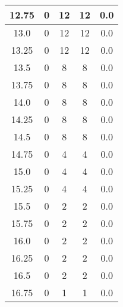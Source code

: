 \documentclass[letterpaper, 12pt]{article}
\begin{document}
\begin{longtable}{|c|c|c|c|c|}
\hline
12.75 & 0 & 12 & 12 & 0.0 \\
\hline
13.0 & 0 & 12 & 12 & 0.0 \\
\hline
13.25 & 0 & 12 & 12 & 0.0 \\
\hline
13.5 & 0 & 8 & 8 & 0.0 \\
\hline
13.75 & 0 & 8 & 8 & 0.0 \\
\hline
14.0 & 0 & 8 & 8 & 0.0 \\
\hline
14.25 & 0 & 8 & 8 & 0.0 \\
\hline
14.5 & 0 & 8 & 8 & 0.0 \\
\hline
14.75 & 0 & 4 & 4 & 0.0 \\
\hline
15.0 & 0 & 4 & 4 & 0.0 \\
\hline
15.25 & 0 & 4 & 4 & 0.0 \\
\hline
15.5 & 0 & 2 & 2 & 0.0 \\
\hline
15.75 & 0 & 2 & 2 & 0.0 \\
\hline
16.0 & 0 & 2 & 2 & 0.0 \\
\hline
16.25 & 0 & 2 & 2 & 0.0 \\
\hline
16.5 & 0 & 2 & 2 & 0.0 \\
\hline
16.75 & 0 & 1 & 1 & 0.0 \\
\hline
\end{longtable}
\end{document}
